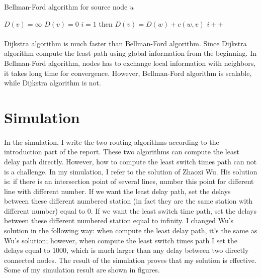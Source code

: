 \documentclass[12pt]{article}
\begin{document}
\begin{algorithm}
\caption{Bellman-Ford algorithm for source node $u$}\label{alg2}
\begin{algorithmic}[1]
\State $D(v)=\infty$
\Else
\State $D(v)=0$
\EndIf
\EndFor
\State $i=1$
\State then $D(v)=D(w)+c(w,v)$ 
\EndIf 
\EndFor
\State $i++$
\EndFor
\end{algorithmic}
\end{algorithm}

\paragraph{}
Dijkstra algorithm is much faster than Bellman-Ford algorithm. Since Dijkstra algorithm compute the least path using global information from the beginning. In Bellman-Ford algorithm, nodes has to exchange local information with neighbors, it takes long time for convergence. However, Bellman-Ford algorithm is scalable, while Dijkstra algorithm is not. 


\section{Simulation}
\paragraph{}
In the simulation, I write the two routing algorithms according to the introduction part of the report. These two algorithms can compute the  least delay path directly. However, how to compute the least switch times path can not is a challenge. In my simulation, I refer to the solution of Zhaoxi Wu. His solution is: if there is an intersection point of several lines, number this point for different line with different number. If we want the least delay path, set the delays between these different numbered station (in fact they are the same station with different number) equal to 0. If we want the least switch time path, set the delays between these different numbered station equal to infinity. I changed Wu's solution in the following way: when compute the least delay path, it's the same as Wu's solution; however, when compute the least switch times path I set the delays equal to $1000$, which is much larger than any delay between two directly connected nodes. The result of the simulation proves that my solution is effective. Some of my simulation result are shown in figures.
\end{document}
